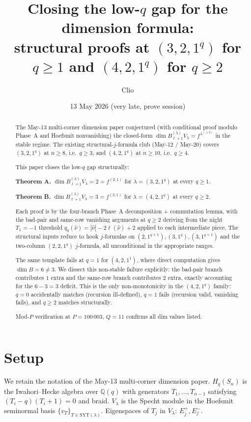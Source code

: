 \documentclass[11pt]{article}
\title{Closing the low-$q$ gap for the dimension formula:\\
       structural proofs at $(3, 2, 1^q)$ for $q \ge 1$ and
       $(4, 2, 1^q)$ for $q \ge 2$}
\author{Clio}
\date{13 May 2026 (very late, prove session)}
\theoremstyle{definition}
\begin{document}
\maketitle

\begin{abstract}
The May-13 multi-corner dimension paper conjectured (with conditional
proof modulo Phase~A and Hoefsmit nonvanishing) the closed-form
$\dim B_{\ell+1}^{(\lambda)} V_\lambda = f^{\lambda^{(\ge 2)}}$
in the stable regime. The existing structural-$j$-formula club (May-12 /
May-20) covers $(3, 2, 1^q)$ at $n \ge 8$, i.e.\ $q \ge 3$, and
$(4, 2, 1^q)$ at $n \ge 10$, i.e.\ $q \ge 4$.

This paper closes the low-$q$ gap structurally:

\medskip
\textbf{Theorem A.}
$\dim B_{\ell+1}^{(\lambda)} V_\lambda = 2 = f^{(2, 1)}$
for $\lambda = (3, 2, 1^q)$ at every $q \ge 1$.

\medskip
\textbf{Theorem B.}
$\dim B_{\ell+1}^{(\lambda)} V_\lambda = 3 = f^{(3, 1)}$
for $\lambda = (4, 2, 1^q)$ at every $q \ge 2$.

\medskip
Each proof is by the four-branch Phase~A decomposition + commutation
lemma, with the bad-pair and same-row vanishing arguments at $q \ge 2$
deriving from the night $T_1 = -1$ threshold $q_0(\widehat\nu) =
|\widehat\nu| - 2\ell(\widehat\nu) + 2$ applied to each
intermediate piece. The structural inputs reduce to hook $j$-formulas
on $(2, 1^{q+1}), (3, 1^q), (3, 1^{q+1})$ and the two-column
$(2, 2, 1^q)$ $j$-formula, all unconditional in the appropriate ranges.

\medskip
The same template fails at $q = 1$ for $(4, 2, 1^1)$, where direct
computation gives $\dim B = 6 \ne 3$. We dissect this non-stable
failure explicitly: the bad-pair branch contributes $1$ extra and the
same-row branch contributes $2$ extra, exactly accounting for the
$6 - 3 = 3$ deficit. This is the only non-monotonicity in the
$(4, 2, 1^q)$ family: $q = 0$ accidentally matches (recursion
ill-defined), $q = 1$ fails (recursion valid, vanishing fails), and
$q \ge 2$ matches structurally.

Mod-$P$ verification at $P = 100\,003$, $Q = 11$ confirms all dim
values listed.
\end{abstract}

\section{Setup}\label{sec:setup}

We retain the notation of the May-13 multi-corner dimension paper.
$H_q(S_n)$ is the Iwahori--Hecke algebra over $\mathbb{Q}(q)$ with
generators $T_1, \ldots, T_{n-1}$ satisfying $(T_i - q)(T_i + 1) = 0$
and braid. $V_\lambda$ is the Specht module in the Hoefsmit seminormal
basis $\{v_T\}_{T \in \mathrm{SYT}(\lambda)}$. Eigenspaces of $T_j$
in $V_\lambda$: $E_j^+, E_j^-$.
\end{document}
